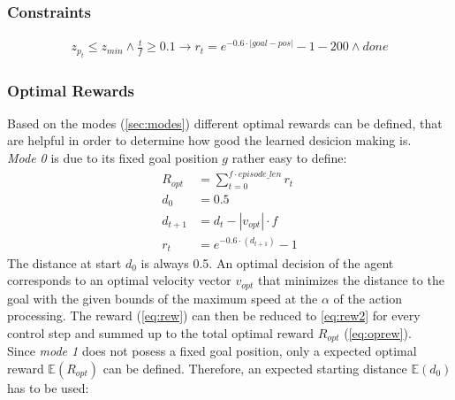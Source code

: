 \subsubsection{Constraints}
\begin{align}
	z_{p_t} \leq z_{min} \land \frac{t}{f} \geq 0.1 \to r_t = e^{-0.6 \cdot |goal - pos|} - 1 -200 \land done
\end{align}

\newpage

\subsubsection{Optimal Rewards}
Based on the modes (\cref{sec:modes}) different optimal rewards can be defined, that are helpful in order to determine how good the learned desicion making is.\\
\newline
\emph{Mode 0} is due to its fixed goal position $g$ rather easy to define:
\begin{align}
R_{opt} &= \sum_{t=0}^{f \cdot episode\_len} r_t \label{eq:oprew}\\
d_0 &= 0.5\\
d_{t+1} &= d_t - |v_{opt}| \cdot f \label{eq:dt1}\\ 
r_{t} &= e^{-0.6 \cdot (d_{t+1} )} - 1 \label{eq:rew2}
\end{align}
The distance at start $d_0$ is always 0.5. An optimal decision of the agent corresponds to an optimal velocity vector $v_{opt}$ that minimizes the distance to the goal with the given bounds of the maximum speed at the $\alpha$ of the action processing. The reward (\cref{eq:rew}) can then be reduced to \cref{eq:rew2} for every control step and summed up to the total optimal reward $R_{opt}$ (\cref{eq:oprew}).\\
\newline
Since \emph{mode 1} does not posess a fixed goal position, only a expected optimal reward $\mathbb{E}(R_{opt})$ can be defined. Therefore, an expected starting distance $\mathbb{E}(d_0)$ has to be used:
